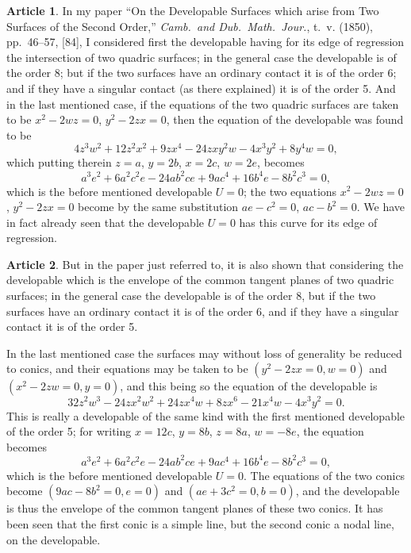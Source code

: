 \documentclass[11pt,a4paper]{article}
\theoremstyle{definition}
\newtheorem{art}{Article}[section]
\begin{document}
\begin{art}
In my paper ``On the Developable Surfaces which arise from Two Surfaces
of the Second Order,'' \textit{Camb.\ and Dub.\ Math.\ Jour.}, t.\ v. (1850), pp.~46--57, [84], I
considered first the developable having for its edge of regression the intersection of two
quadric surfaces; in the general case the developable is of the order 8; but if the
two surfaces have an ordinary contact it is of the order 6; and if they have a
singular contact (as there explained) it is of the order 5. And in the last mentioned
case, if the equations of the two quadric surfaces are taken to be $x^2 - 2wz = 0$,
$y^2 - 2zx = 0$, then the equation of the developable was found to be
\[
4z^3w^2 + 12z^2x^2 + 9zx^4 - 24zxy^2w - 4x^3y^2 + 8y^4w = 0,
\]
which putting therein $z = a$, $y = 2b$, $x = 2c$, $w = 2e$, becomes
\[
a^3e^2 + 6a^2c^2e - 24ab^2ce + 9ac^4 + 16b^4e - 8b^2c^3 = 0,
\]
which is the before mentioned developable $U = 0$; the two equations $x^2 - 2wz = 0$,
$y^2 - 2zx = 0$ become by the same substitution $ae - c^2 = 0$, $ac - b^2 = 0$.
We have in fact already seen that the developable $U = 0$ has this curve for its
edge of regression.
\end{art}

\setcounter{art}{17}
\begin{art}
But in the paper just referred to, it is also shown that considering the
developable which is the envelope of the common tangent planes of two quadric
surfaces; in the general case the developable is of the order 8, but if the two surfaces
have an ordinary contact it is of the order 6, and if they have a singular contact it
is of the order 5.

In the last mentioned case the surfaces may without loss of generality be reduced to
conics, and their equations may be taken to be $(y^2 - 2zx = 0, w = 0)$ and
$(x^2 - 2zw = 0, y = 0)$, and this being so the equation of the developable is
\[
32z^2w^3 - 24zx^2w^2 + 24zx^4w + 8zx^6 - 21x^4w - 4x^3y^2 = 0.
\]
This is really a developable of the same kind with the first mentioned developable of
the order 5; for writing $x = 12c$, $y = 8b$, $z = 8a$, $w = -8e$, the equation becomes
\[
a^3e^2 + 6a^2c^2e - 24ab^2ce + 9ac^4 + 16b^4e - 8b^2c^3 = 0,
\]
which is the before mentioned developable $U = 0$. The equations of the two conics
become $(9ac - 8b^2 = 0, e = 0)$ and $(ae + 3c^2 = 0, b = 0)$, and the developable is thus the
envelope of the common tangent planes of these two conics. It has been seen that
the first conic is a simple line, but the second conic a nodal line, on the developable.
\end{art}
\end{document}
